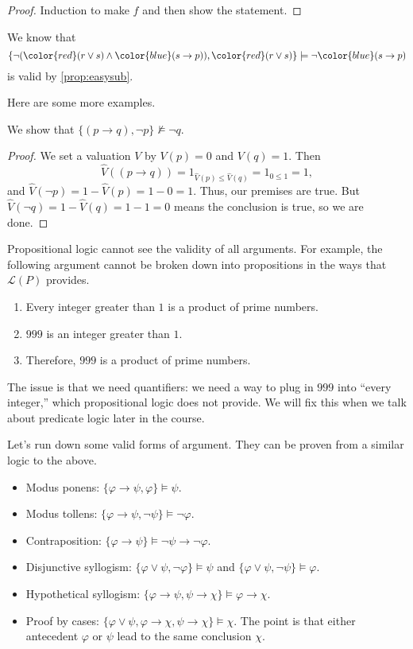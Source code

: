 \begin{proof}
	Induction to make $f$ and then show the statement.
\end{proof}
\begin{example}
	We know that
	\[\{\lnot({\color{red}(r\lor s)}\land{\color{blue}(s\to p)}),{\color{red}(r\lor s)}\}\models\lnot{\color{blue}(s\to p)}\]
	is valid by \autoref{prop:easysub}.
\end{example}
Here are some more examples.
\begin{exe}
	We show that $\{(p\to q),\lnot p\}\nvDash\lnot q$.
\end{exe}
\begin{proof}
	We set a valuation $V$ by $V(p)=0$ and $V(q)=1$. Then
	\[\hat V((p\to q))=1_{\hat V(p)\le\hat V(q)}=1_{0\le1}=1,\]
	and $\hat V(\lnot p)=1-\hat V(p)=1-0=1$. Thus, our premises are true. But $\hat V(\lnot q)=1-\hat V(q)=1-1=0$ means the conclusion is true, so we are done.
\end{proof}
\begin{remark}
	Propositional logic cannot see the validity of all arguments. For example, the following argument cannot be broken down into propositions in the ways that $\mathcal L(P)$ provides.
	\begin{enumerate}
		\item Every integer greater than $1$ is a product of prime numbers.
		\item $999$ is an integer greater than $1$.
		\item Therefore, $999$ is a product of prime numbers.
	\end{enumerate}
	The issue is that we need quantifiers: we need a way to plug in $999$ into ``every integer,'' which propositional logic does not provide. We will fix this when we talk about predicate logic later in the course.
\end{remark}
Let's run down some valid forms of argument. They can be proven from a similar logic to the above.
\begin{itemize}
	\item Modus ponens: $\{\varphi\to\psi,\varphi\}\models\psi$.
	\item Modus tollens: $\{\varphi\to\psi,\lnot\psi\}\models\lnot\varphi$.
	\item Contraposition: $\{\varphi\to\psi\}\models\lnot\psi\to\lnot\varphi$.
	\item Disjunctive syllogism: $\{\varphi\lor\psi,\lnot\varphi\}\models\psi$ and $\{\varphi\lor\psi,\lnot\psi\}\models\varphi$.
	\item Hypothetical syllogism: $\{\varphi\to\psi,\psi\to\chi\}\models\varphi\to\chi$.
	\item Proof by cases: $\{\varphi\lor\psi,\varphi\to\chi,\psi\to\chi\}\models\chi$. The point is that either antecedent $\varphi$ or $\psi$ lead to the same conclusion $\chi$.
\end{itemize}

